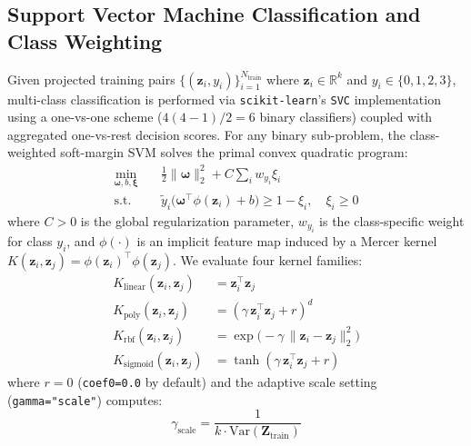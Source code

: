 \documentclass[conference]{IEEEtran}
\begin{document}
\subsection{Support Vector Machine Classification and Class Weighting}
Given projected training pairs $\{(\mathbf{z}_i, y_i)\}_{i=1}^{N_{\text{train}}}$ where $\mathbf{z}_i \in \mathbb{R}^k$ and $y_i \in \{0, 1, 2, 3\}$, multi-class classification is performed via \texttt{scikit-learn}'s \texttt{SVC} implementation using a one-vs-one scheme ($4(4-1)/2 = 6$ binary classifiers) coupled with aggregated one-vs-rest decision scores. For any binary sub-problem, the class-weighted soft-margin SVM solves the primal convex quadratic program:
\begin{align}
    \min_{\boldsymbol{\omega}, b, \boldsymbol{\xi}} \quad & \frac{1}{2} \|\boldsymbol{\omega}\|_2^2 + C \sum_{i} w_{y_i} \xi_i \nonumber \\
    \text{s.t.} \quad & \tilde{y}_i \big(\boldsymbol{\omega}^\top \phi(\mathbf{z}_i) + b\big) \ge 1 - \xi_i, \quad \xi_i \ge 0
    \label{eq:svm_primal}
\end{align}
where $C > 0$ is the global regularization parameter, $w_{y_i}$ is the class-specific weight for class $y_i$, and $\phi(\cdot)$ is an implicit feature map induced by a Mercer kernel $K(\mathbf{z}_i, \mathbf{z}_j) = \phi(\mathbf{z}_i)^\top \phi(\mathbf{z}_j)$. We evaluate four kernel families:
\begin{align}
    K_{\text{linear}}(\mathbf{z}_i, \mathbf{z}_j) &= \mathbf{z}_i^\top \mathbf{z}_j \\
    K_{\text{poly}}(\mathbf{z}_i, \mathbf{z}_j) &= (\gamma \, \mathbf{z}_i^\top \mathbf{z}_j + r)^d \\
    K_{\text{rbf}}(\mathbf{z}_i, \mathbf{z}_j) &= \exp\big(-\gamma \, \|\mathbf{z}_i - \mathbf{z}_j\|_2^2\big) \\
    K_{\text{sigmoid}}(\mathbf{z}_i, \mathbf{z}_j) &= \tanh(\gamma \, \mathbf{z}_i^\top \mathbf{z}_j + r)
\end{align}
where $r = 0$ (\texttt{coef0=0.0} by default) and the adaptive scale setting (\texttt{gamma="scale"}) computes:
\begin{equation}
    \gamma_{\text{scale}} = \frac{1}{k \cdot \text{Var}(\mathbf{Z}_{\text{train}})}
    \label{eq:gamma_scale}
\end{equation}
\end{document}
